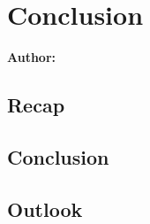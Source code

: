 \chapter{Conclusion}

\textbf{Author: } 

\section{Recap}

\section{Conclusion}

\section{Outlook}

\filbreak